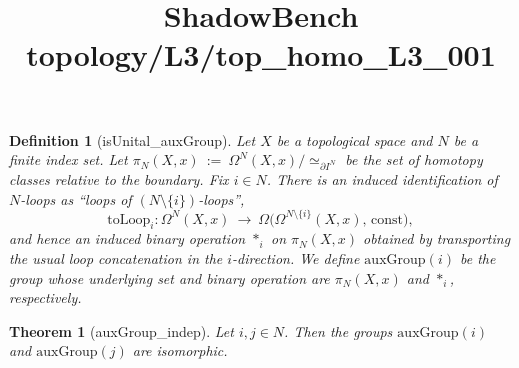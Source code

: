 \documentclass{article}
\title{ShadowBench topology/L3/top\_homo\_L3\_001}
\newtheorem{theorem}{Theorem}
\newtheorem{definition}{Definition}
\begin{document}
\maketitle

\begin{definition}[isUnital_auxGroup]
   Let $X$ be a topological space and $N$ be a finite index set.  
   Let $\pi_N(X,x)\ :=\ \Omega^{N}(X,x)\big/\simeq_{\partial I^N}$ be the set of homotopy classes relative to the boundary. Fix $i\in N$. There is an induced identification of $N$-loops as ``loops of $(N\setminus\{i\})$-loops'',
\[
\mathrm{toLoop}_i : \Omega^{N}(X,x)\ \longrightarrow\ \Omega\!\bigl(\Omega^{N\setminus\{i\}}(X,x),\,\mathrm{const}\bigr),
\]
and hence an induced binary operation $\ast_i$  on $\pi_N(X,x)$ obtained by transporting the usual loop
concatenation in the $i$-direction. We define $\mathrm{auxGroup}(i)$ be the group whose underlying set and binary operation are $\pi_N(X,x)$ and $\ast_i$, respectively.
\end{definition}


\begin{theorem}[auxGroup_indep]
Let $i,j\in N$. Then the groups $\mathrm{auxGroup}(i)$ and $\mathrm{auxGroup}(j)$ are isomorphic.
\end{theorem}
\end{document}
